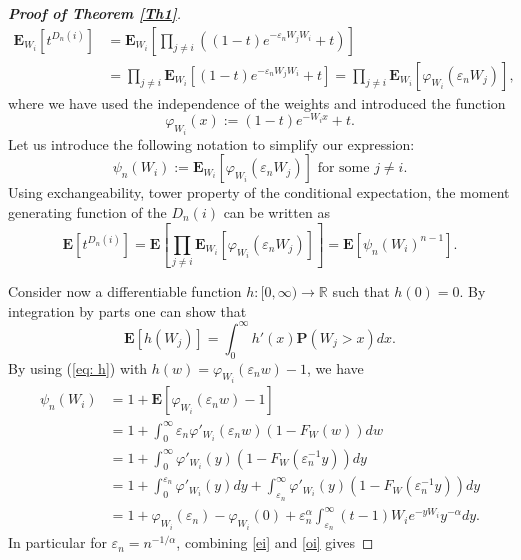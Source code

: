 \documentclass[11pt, reqno]{amsart}
\numberwithin{equation}{section}
\theoremstyle{plain} %
\theoremstyle{definition} %
\newcommand{\eps}{\varepsilon}
\newcommand{\prob}{\mathbf{P}}
\newcommand{\E}{\mathbf{E}}
\begin{document}
\begin{proof}[{\bf Proof of Theorem \ref{Th1}}]
\begin{equation} \label{eq: Thm2}
    \begin{split}
     \E_{W_i}[t^{D_n(i)}] &= \E_{W_i}\left[ \prod_{j \neq i} \left( (1-t) e^{-\eps_n W_j W_i } +t  \right)\right] \\
        & =\prod_{j \neq i} \E_{W_i}\left[  (1-t) e^{-\eps_n W_j W_i } +t     \right]  = \prod_{j \neq i}  \E_{W_i}\left[ \varphi_{W_i}(\eps_n W_j)  \right],
    \end{split}
\end{equation}
where we have used the independence of the weights and introduced the function
$$\varphi_{W_{i}}(x) := (1-t)e^{-W_i x} + t .$$
Let us introduce the following notation to simplify our expression:
\begin{equation}
   \psi_n(W_{i}) := \E_{W_i} \left[  \varphi_{W_{i}}(\eps_n W_j)   \right] \text{ for some $j\neq i$}. 
\end{equation}
Using exchangeability, tower property of the conditional expectation, the moment generating function of the $D_n(i)$ can be written as
\begin{equation}\label{ei}
         \E[t^{D_n(i)}] = \E\left[ \prod_{j \neq i}  \E_{W_i} \left[  \varphi_{W_{i}}(\eps_n W_j)   \right] \right] = \E\left[ \psi_n(W_{i})^{n-1} \right]. 
\end{equation}


Consider now a  differentiable function $h:[0,\infty) \to \mathbb{R}$ such that $h(0) = 0$. By integration by parts one can show that
\begin{equation} \label{eq: h}
   \E[h(W_j)] = \int_0^{\infty} h'(x) \prob(W_j >x) dx .
\end{equation}
By using (\ref{eq: h}) with $h(w) = \varphi_{W_i}(\eps_n w) - 1$, we have
\begin{equation}\label{oi}
    \begin{split}
   \psi_n (W_{i}) &= 1 + \E\left[  \varphi_{W_{i}}(\eps_n w)  - 1\right] \\
    &= 1 + \int_0^{\infty} \eps_n \varphi'_{W_{i}}(\eps_n w)  (1 - F_{W}(w)) dw \\
     &= 1 + \int_0^{\infty}  \varphi'_{W_{i}}(y)  (1 - F_{W}(\eps_n^{-1} y)) dy \\
      & =   1 +  \int_0^{\eps_n} \varphi'_{W_{i}}(y)dy+ \int_{\eps_n}^\infty  \varphi'_{W_{i}}(y)   (1 - F_{W}(\eps_n^{-1} y)) dy   \\
      &= 1 + \varphi_{W_i}(\eps_n)-\varphi_{W_i}(0)+ \eps_n^{\alpha}\int_{\eps_n}^\infty (t-1) W_{i} e^{-yW_{i}} y^{-\alpha} dy.
    \end{split}
\end{equation}
In particular for $\eps_n=n^{-1/\alpha}$, combining \eqref{ei} and \eqref{oi} gives 



\end{proof}
\end{document}
